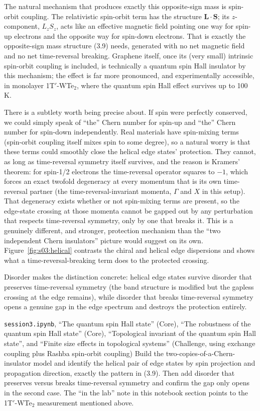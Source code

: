 The natural mechanism that produces exactly this opposite-sign mass is spin-orbit coupling. The
relativistic spin-orbit term has the structure $\mathbf{L}\cdot\mathbf{S}$; its $z$-component,
$L_zS_z$, acts like an effective magnetic field pointing one way for spin-up electrons and the
opposite way for spin-down electrons. That is exactly the opposite-sign mass structure (3.9) needs,
generated with no net magnetic field and no net time-reversal breaking. Graphene itself, once its
(very small) intrinsic spin-orbit coupling is included, is technically a quantum spin Hall insulator
by this mechanism; the effect is far more pronounced, and experimentally accessible, in monolayer
1T$'$-WTe$_2$, where the quantum spin Hall effect survives up to 100 K.

There is a subtlety worth being precise about. If spin were perfectly conserved, we could simply
speak of ``the'' Chern number for spin-up and ``the'' Chern number for spin-down independently. Real
materials have spin-mixing terms (spin-orbit coupling itself mixes spin to some degree), so a natural
worry is that these terms could smoothly close the helical edge states' protection. They cannot, as
long as time-reversal symmetry itself survives, and the reason is Kramers' theorem: for spin-1/2
electrons the time-reversal operator squares to $-1$, which forces an exact twofold degeneracy at
every momentum that is its own time-reversal partner (the time-reversal-invariant momenta, $\Gamma$
and $X$ in this setup). That degeneracy exists whether or not spin-mixing terms are present, so the
edge-state crossing at those momenta cannot be gapped out by any perturbation that respects
time-reversal symmetry, only by one that breaks it. This is a genuinely different, and stronger,
protection mechanism than the ``two independent Chern insulators'' picture would suggest on its own.
Figure~\ref{fig:s03:helical} contrasts the chiral and helical edge dispersions and shows what a
time-reversal-breaking term does to the protected crossing.



Disorder makes the distinction concrete: helical edge states survive disorder that preserves
time-reversal symmetry (the band structure is modified but the gapless crossing at the edge remains),
while disorder that breaks time-reversal symmetry opens a genuine gap in the edge spectrum and
destroys the protection entirely.

\begin{notebookbox}{\texttt{session3.ipynb}, ``The quantum spin Hall state'' (Core), ``The robustness of the quantum spin Hall state'' (Core), ``Topological invariant of the quantum spin Hall state'', and ``Finite size effects in topological systems'' (Challenge, using exchange coupling plus Rashba spin-orbit coupling)}
Build the two-copies-of-a-Chern-insulator model and identify the helical pair of edge states by
spin projection and propagation direction, exactly the pattern in (3.9). Then add disorder that
preserves versus breaks time-reversal symmetry and confirm the gap only opens in the second case.
The ``in the lab'' note in this notebook section points to the 1T$'$-WTe$_2$ measurement mentioned
above.
\end{notebookbox}

